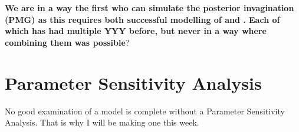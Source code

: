 
\textbf{We are in a way the first who can simulate the posterior invagination (PMG)  as this requires both successful modelling of  and . Each of which has had multiple YYY before, but never in a way where combining them was possible}?


\section{Parameter Sensitivity Analysis}
No good examination of a model is complete without a Parameter Sensitivity Analysis. That is why I will be making one this week.




